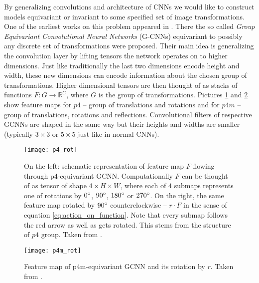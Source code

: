     By generalizing convolutions and architecture of CNNs we would like to
    construct models
    equivariant or invariant to some specified set of image transformations.
    One of the earliest works on this problem appeared in \cite{cohen2016}. There
    the so called \textit{Group Equivariant Convolutional Neural Networks}
    (G-CNNs) equivariant to possibly any discrete set of transformations were
    proposed. Their main idea is generalizing the convolution layer by
    lifting tensors the network operates on to higher dimensions.
    Just like traditionally the last two
    dimensions encode height and width, these new dimensions can
    encode information about the chosen group of transformations. Higher
    dimensional tensors are then thought of as stacks of functions
    $F:G\to\mathbb{R}^C$, where $G$ is the group of transformations.
    Pictures \ref{fig:p4_rot} and \ref{fig:p4m_rot} show
    feature maps for $p4$ -- group of translations and rotations and for
    $p4m$ -- group of
    translations, rotations and reflections.
    Convolutional filters of respective GCNNs are shaped in the same way
    but their heights and widths are smaller (typically $3\times3$ or $5\times5$
    just like in normal CNNs).
    \begin{figure}[h]
        \centering
        \texttt{[image: p4\_rot]}
        \caption{On the left: schematic representation of feature map $F$ flowing through
            p4-equivariant GCNN. Computationally $F$ can be thought of as tensor of shape
            $4\times H \times W$, where each of $4$ submaps represents one of
            rotations by $0\degree$, $90\degree$, $180\degree$ or $270\degree$.
            On the right, the same feature map rotated by
            $90 \degree$ counterclockwise -- $r\cdot F$ in the sense of equation
            \ref{eq:action_on_function}. Note that every submap follows the
            red arrow as well as gets rotated. This stems from the structure of
            $p4$ group. Taken from \cite{cohen2016}.}
        \label{fig:p4_rot}
    \end{figure}
    \begin{figure}[h]
        \centering
        \texttt{[image: p4m\_rot]}
        \caption{Feature map of p4m-equivariant GCNN and its rotation by $r$.
                    Taken from \cite{cohen2016}.}
        \label{fig:p4m_rot}
    \end{figure}

